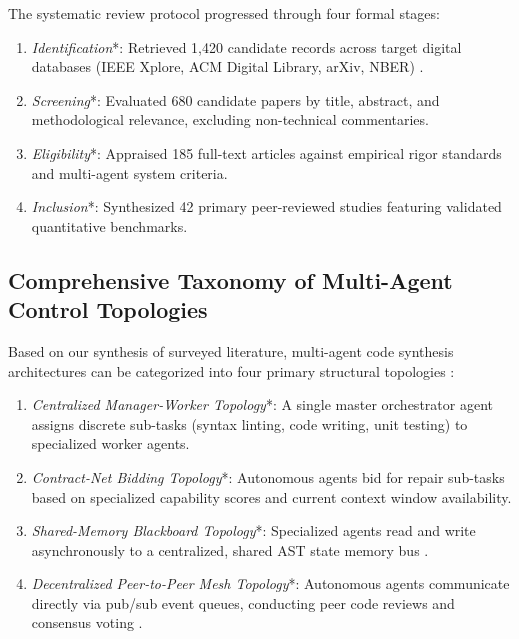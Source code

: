 \documentclass[10pt,journal,compsoc,twocolumn]{IEEEtran}
\begin{document}
The systematic review protocol progressed through four formal stages:
\begin{enumerate}
  \item \textit{Identification}*: Retrieved 1,420 candidate records across target digital databases (IEEE Xplore, ACM Digital Library, arXiv, NBER) \cite{prisma2020}.
  \item \textit{Screening}*: Evaluated 680 candidate papers by title, abstract, and methodological relevance, excluding non-technical commentaries.
  \item \textit{Eligibility}*: Appraised 185 full-text articles against empirical rigor standards and multi-agent system criteria.
  \item \textit{Inclusion}*: Synthesized 42 primary peer-reviewed studies featuring validated quantitative benchmarks.
\end{enumerate}


\subsection{Comprehensive Taxonomy of Multi-Agent Control Topologies}

Based on our synthesis of surveyed literature, multi-agent code synthesis architectures can be categorized into four primary structural topologies \cite{wooldridge2009}:
\begin{enumerate}
  \item \textit{Centralized Manager-Worker Topology}*: A single master orchestrator agent assigns discrete sub-tasks (syntax linting, code writing, unit testing) to specialized worker agents.
  \item \textit{Contract-Net Bidding Topology}*: Autonomous agents bid for repair sub-tasks based on specialized capability scores and current context window availability.
  \item \textit{Shared-Memory Blackboard Topology}*: Specialized agents read and write asynchronously to a centralized, shared AST state memory bus \cite{feuerriegel2023generativeai}.
  \item \textit{Decentralized Peer-to-Peer Mesh Topology}*: Autonomous agents communicate directly via pub/sub event queues, conducting peer code reviews and consensus voting \cite{crossref_10_56975_ijcrt_v14i1_297627}.
\end{enumerate}
\end{document}
